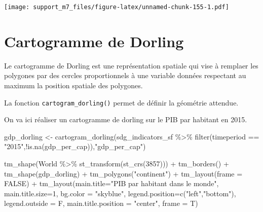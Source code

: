 \documentclass[
]{book}
\newenvironment{Shaded}{\begin{snugshade}}{\end{snugshade}}
\newcommand{\AttributeTok}[1]{\textcolor[rgb]{0.77,0.63,0.00}{#1}}
\newcommand{\ConstantTok}[1]{\textcolor[rgb]{0.00,0.00,0.00}{#1}}
\newcommand{\DecValTok}[1]{\textcolor[rgb]{0.00,0.00,0.81}{#1}}
\newcommand{\FunctionTok}[1]{\textcolor[rgb]{0.00,0.00,0.00}{#1}}
\newcommand{\NormalTok}[1]{#1}
\newcommand{\OtherTok}[1]{\textcolor[rgb]{0.56,0.35,0.01}{#1}}
\newcommand{\SpecialCharTok}[1]{\textcolor[rgb]{0.00,0.00,0.00}{#1}}
\newcommand{\StringTok}[1]{\textcolor[rgb]{0.31,0.60,0.02}{#1}}
\begin{document}
\texttt{[image: support\_m7\_files/figure-latex/unnamed-chunk-155-1.pdf]}

\hypertarget{cartogramme-de-dorling}{%
\section{Cartogramme de Dorling}\label{cartogramme-de-dorling}}

Le cartogramme de Dorling est une représentation spatiale qui vise à remplaer les polygones par des cercles proportionnels à une variable données respectant au maximum la position spatiale des polygones.

La fonction \texttt{cartogram\_dorling()} permet de définir la géométrie attendue.

On va ici réaliser un cartogramme de dorling sur le PIB par habitant en 2015.

\begin{Shaded}
\begin{Highlighting}[]
\NormalTok{gdp\_dorling }\OtherTok{\textless{}{-}} \FunctionTok{cartogram\_dorling}\NormalTok{(sdg\_indicators\_sf }\SpecialCharTok{\%\textgreater{}\%}
                                   \FunctionTok{filter}\NormalTok{(timeperiod }\SpecialCharTok{==} \StringTok{"2015"}\NormalTok{,}\SpecialCharTok{!}\FunctionTok{is.na}\NormalTok{(gdp\_per\_cap)),}\StringTok{"gdp\_per\_cap"}\NormalTok{)}
\end{Highlighting}
\end{Shaded}

\begin{Shaded}
\begin{Highlighting}[]
\FunctionTok{tm\_shape}\NormalTok{(World }\SpecialCharTok{\%\textgreater{}\%} \FunctionTok{st\_transform}\NormalTok{(}\FunctionTok{st\_crs}\NormalTok{(}\DecValTok{3857}\NormalTok{))) }\SpecialCharTok{+} 
  \FunctionTok{tm\_borders}\NormalTok{() }\SpecialCharTok{+}
  \FunctionTok{tm\_shape}\NormalTok{(gdp\_dorling) }\SpecialCharTok{+} 
  \FunctionTok{tm\_polygons}\NormalTok{(}\StringTok{"continent"}\NormalTok{) }\SpecialCharTok{+}
  \FunctionTok{tm\_layout}\NormalTok{(}\AttributeTok{frame =} \ConstantTok{FALSE}\NormalTok{) }\SpecialCharTok{+}
  \FunctionTok{tm\_layout}\NormalTok{(}\AttributeTok{main.title=}\StringTok{"PIB par habitant dans le monde"}\NormalTok{,}
            \AttributeTok{main.title.size=}\DecValTok{1}\NormalTok{,}
            \AttributeTok{bg.color =} \StringTok{"skyblue"}\NormalTok{,}
            \AttributeTok{legend.position=}\FunctionTok{c}\NormalTok{(}\StringTok{"left"}\NormalTok{,}\StringTok{"bottom"}\NormalTok{),}
            \AttributeTok{legend.outside =}\NormalTok{ F,}
            \AttributeTok{main.title.position =} \StringTok{"center"}\NormalTok{,}
            \AttributeTok{frame =}\NormalTok{ T)}
\end{Highlighting}
\end{Shaded}
\end{document}
